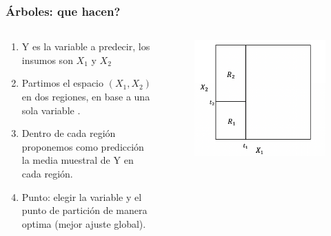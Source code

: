\documentclass[
  shownotes,
  xcolor={svgnames},
  hyperref={colorlinks,citecolor=DarkBlue,linkcolor=DarkRed,urlcolor=DarkBlue}
  , aspectratio=169]{beamer}
\begin{document}
\begin{frame}[fragile]
\frametitle{Árboles: que hacen?}


\begin{columns}[T] %
\begin{column}{.42\textwidth}
  
\begin{enumerate}
    \footnotesize
\item Y es la variable a predecir, los insumos son $X_1$ y $X_2$
\item  Partimos el espacio $(X_1,X_2)$ en dos regiones, en base a una sola variable .
\item Dentro de cada región proponemos como predicción la media muestral de Y en cada región.
\item Punto: elegir la variable y el punto de partición de manera optima (mejor ajuste global).
\end{enumerate}


\end{column}  
\hfill
\begin{column}{.48\textwidth}

 \begin{figure}[H] \centering
            \captionsetup{justification=centering}
              \includegraphics[scale=0.4]{figures/cart_3}                           
 \end{figure}

\end{column}
\end{columns}

\end{frame}
\end{document}
